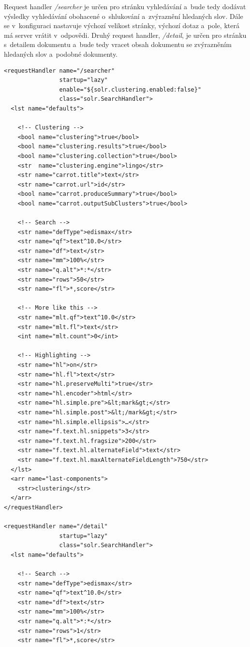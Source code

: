 Request handler \emph{/searcher} je určen pro stránku vyhledávání a~bude tedy dodávat výsledky vyhledávání obohacené o~shlukování a~zvýraznění hledaných slov. Dále se v~konfiguraci nastavuje výchozí velikost stránky, výchozí dotaz a~pole, která má server vrátit v~odpovědi. Druhý request handler, \emph{/detail}, je určen pro stránku s~detailem dokumentu a~bude tedy vracet obsah dokumentu se zvýrazněním hledaných slov a~podobné dokumenty.

\begin{verbatim}
<requestHandler name="/searcher"
                startup="lazy"
                enable="${solr.clustering.enabled:false}"
                class="solr.SearchHandler">
  <lst name="defaults">
  
    <!-- Clustering -->
    <bool name="clustering">true</bool>
    <bool name="clustering.results">true</bool>
    <bool name="clustering.collection">true</bool>
    <str  name="clustering.engine">lingo</str>
    <str name="carrot.title">text</str>
    <str name="carrot.url">id</str>
    <bool name="carrot.produceSummary">true</bool>
    <bool name="carrot.outputSubClusters">true</bool>
    
    <!-- Search -->
    <str name="defType">edismax</str>
    <str name="qf">text^10.0</str>
    <str name="df">text</str>
    <str name="mm">100%</str>
    <str name="q.alt">*:*</str>
    <str name="rows">50</str>
    <str name="fl">*,score</str>
    
    <!-- More like this -->
    <str name="mlt.qf">text^10.0</str>
    <str name="mlt.fl">text</str>
    <int name="mlt.count">0</int>
    
    <!-- Highlighting -->
    <str name="hl">on</str>
    <str name="hl.fl">text</str>
    <str name="hl.preserveMulti">true</str>
    <str name="hl.encoder">html</str>
    <str name="hl.simple.pre">&lt;mark&gt;</str>
    <str name="hl.simple.post">&lt;/mark&gt;</str>
    <str name="hl.simple.ellipsis">…</str>
    <str name="f.text.hl.snippets">3</str>
    <str name="f.text.hl.fragsize">200</str>
    <str name="f.text.hl.alternateField">text</str>
    <str name="f.text.hl.maxAlternateFieldLength">750</str>
  </lst>
  <arr name="last-components">
    <str>clustering</str>
  </arr>
</requestHandler>

<requestHandler name="/detail"
                startup="lazy"
                class="solr.SearchHandler">
  <lst name="defaults">
  
    <!-- Search -->
    <str name="defType">edismax</str>
    <str name="qf">text^10.0</str>
    <str name="df">text</str>
    <str name="mm">100%</str>
    <str name="q.alt">*:*</str>
    <str name="rows">1</str>
    <str name="fl">*,score</str>
    

\end{verbatim}
